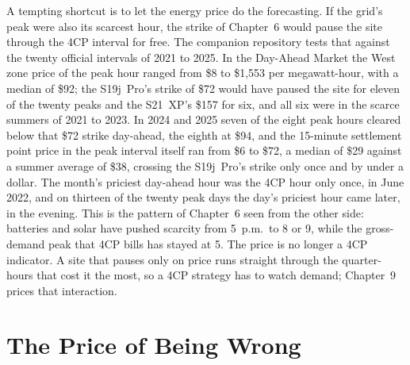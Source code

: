 A tempting shortcut is to let the energy price do the forecasting. If the grid's peak were also its scarcest hour, the strike of Chapter~6 would pause the site through the 4CP interval for free. The companion repository tests that against the twenty official intervals of 2021 to 2025. In the Day-Ahead Market the West zone price of the peak hour ranged from \$8 to \$1,553 per megawatt-hour, with a median of \$92; the S19j~Pro's strike of \$72 would have paused the site for eleven of the twenty peaks and the S21~XP's \$157 for six, and all six were in the scarce summers of 2021 to 2023. %
In 2024 and 2025 seven of the eight peak hours cleared below that \$72 strike day-ahead, the eighth at \$94, and the 15-minute settlement point price in the peak interval itself ran from \$6 to \$72, a median of \$29 against a summer average of \$38, crossing the S19j~Pro's strike only once and by under a dollar. %
The month's priciest day-ahead hour was the 4CP hour only once, in June 2022, and on thirteen of the twenty peak days the day's priciest hour came later, in the evening. %
This is the pattern of Chapter~6 seen from the other side: batteries and solar have pushed scarcity from 5~p.m.\ to 8 or 9, while the gross-demand peak that 4CP bills has stayed at 5. The price is no longer a 4CP indicator. A site that pauses only on price runs straight through the quarter-hours that cost it the most, so a 4CP strategy has to watch demand; Chapter~9 prices that interaction.

\section{The Price of Being Wrong}
\label{sec:fourcp-econ}

